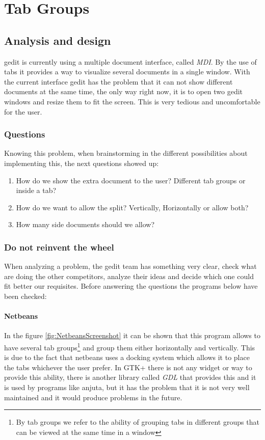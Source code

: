 
\chapter{Tab Groups}

\section{Analysis and design}

gedit is currently using a multiple document interface, called \emph{MDI}. By the use of tabs it provides a way to visualize several documents in a single window. With the current interface gedit has the problem that it can not show different documents at the same time, the only way right now, it is to open two gedit windows and resize them to fit the screen. This is very tedious and uncomfortable for the user.

\subsection{Questions}

Knowing this problem, when brainstorming in the different possibilities about implementing this, the next questions showed up:
\begin{enumerate}
  \item How do we show the extra document to the user? Different tab groups or inside a tab?
  \item How do we want to allow the split? Vertically, Horizontally or allow both?
  \item How many side documents should we allow?
\end{enumerate}

\subsection{Do not reinvent the wheel}

When analyzing a problem, the gedit team has something very clear, check what are doing the other competitors, analyze their ideas and decide which one could fit better our requisites. Before answering the questions the programs below have been checked:

\subsubsection{Netbeans}

In the figure \ref{fig:NetbeansScreenshot} it can be shown that this program allows to have several tab groups\footnote{By tab groups we refer to the ability of grouping tabs in different groups that can be viewed at the same time in a window} and group them either horizontally and vertically. This is due to the fact that netbeans uses a docking system which allows it to place the tabs whichever the user prefer. In GTK+ there is not any widget or way to provide this ability, there is another library called \emph{GDL} that provides this and it is used by programs like anjuta, but it has the problem that it is not very well maintained and it would produce problems in the future.

